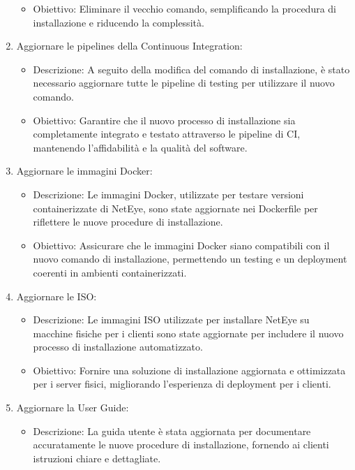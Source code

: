 \begin{enumerate}
\begin{itemize}
      \item Obiettivo: Eliminare il vecchio comando, semplificando la procedura di
        installazione e riducendo la complessità.
    \end{itemize}

  \item Aggiornare le pipelines della Continuous Integration:
    \begin{itemize}
      \item Descrizione: A seguito della modifica del comando di installazione, è
        stato necessario aggiornare tutte le pipeline di testing per utilizzare il
        nuovo comando.

      \item Obiettivo: Garantire che il nuovo processo di installazione sia
        completamente integrato e testato attraverso le pipeline di CI, mantenendo
        l'affidabilità e la qualità del software.
    \end{itemize}

  \item Aggiornare le immagini Docker:
    \begin{itemize}
      \item Descrizione: Le immagini Docker, utilizzate per testare versioni containerizzate
        di NetEye, sono state aggiornate nei Dockerfile per riflettere le nuove
        procedure di installazione.

      \item Obiettivo: Assicurare che le immagini Docker siano compatibili con
        il nuovo comando di installazione, permettendo un testing e un deployment
        coerenti in ambienti containerizzati.
    \end{itemize}

  \item Aggiornare le ISO:
    \begin{itemize}
      \item Descrizione: Le immagini ISO utilizzate per installare NetEye su
        macchine fisiche per i clienti sono state aggiornate per includere il
        nuovo processo di installazione automatizzato.

      \item Obiettivo: Fornire una soluzione di installazione aggiornata e
        ottimizzata per i server fisici, migliorando l'esperienza di deployment per
        i clienti.
    \end{itemize}

  \item Aggiornare la User Guide:
    \begin{itemize}
      \item Descrizione: La guida utente è stata aggiornata per documentare
        accuratamente le nuove procedure di installazione, fornendo ai clienti istruzioni
        chiare e dettagliate.


\end{itemize}
\end{enumerate}
